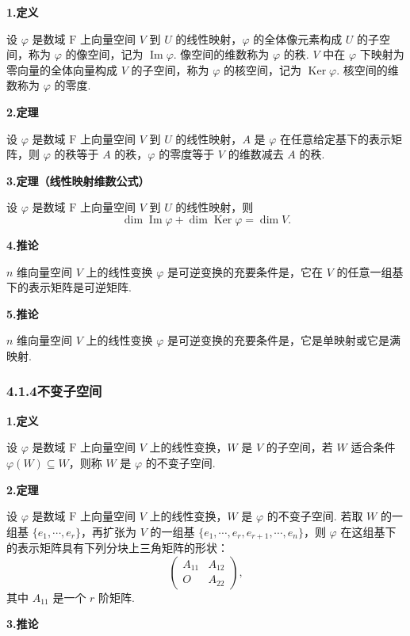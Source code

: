 \documentclass[UTF8,12pt,a4paper,fontset=fandol]{ctexart}
\begin{document}
\noindent\textbf{1.\quad 定义}

设 $\varphi$ 是数域 $\mathrm{F}$ 上向量空间 $V$ 到 $U$ 的线性映射，$\varphi$ 的全体像元素构成 $U$ 的子空间，称为 $\varphi$ 的像空间，记为 $\operatorname{Im}\varphi$. 像空间的维数称为 $\varphi$ 的秩. $V$ 中在 $\varphi$ 下映射为零向量的全体向量构成 $V$ 的子空间，称为 $\varphi$ 的核空间，记为 $\operatorname{Ker}\varphi$. 核空间的维数称为 $\varphi$ 的零度.

\noindent\textbf{2.\quad 定理}

设 $\varphi$ 是数域 $\mathrm{F}$ 上向量空间 $V$ 到 $U$ 的线性映射，$A$ 是 $\varphi$ 在任意给定基下的表示矩阵，则 $\varphi$ 的秩等于 $A$ 的秩，$\varphi$ 的零度等于 $V$ 的维数减去 $A$ 的秩.

\noindent\textbf{3.\quad 定理（线性映射维数公式）}

设 $\varphi$ 是数域 $\mathrm{F}$ 上向量空间 $V$ 到 $U$ 的线性映射，则
\[
\dim\operatorname{Im}\varphi+\dim\operatorname{Ker}\varphi=\dim V.
\]

\noindent\textbf{4.\quad 推论}

$n$ 维向量空间 $V$ 上的线性变换 $\varphi$ 是可逆变换的充要条件是，它在 $V$ 的任意一组基下的表示矩阵是可逆矩阵.

\noindent\textbf{5.\quad 推论}

$n$ 维向量空间 $V$ 上的线性变换 $\varphi$ 是可逆变换的充要条件是，它是单映射或它是满映射.

\subsubsection*{4.1.4\quad 不变子空间}

\noindent\textbf{1.\quad 定义}

设 $\varphi$ 是数域 $\mathrm{F}$ 上向量空间 $V$ 上的线性变换，$W$ 是 $V$ 的子空间，若 $W$ 适合条件 $\varphi(W)\subseteq W$，则称 $W$ 是 $\varphi$ 的不变子空间.

\noindent\textbf{2.\quad 定理}

设 $\varphi$ 是数域 $\mathrm{F}$ 上向量空间 $V$ 上的线性变换，$W$ 是 $\varphi$ 的不变子空间. 若取 $W$ 的一组基 $\{e_1,\cdots,e_r\}$，再扩张为 $V$ 的一组基 $\{e_1,\cdots,e_r,e_{r+1},\cdots,e_n\}$，则 $\varphi$ 在这组基下的表示矩阵具有下列分块上三角矩阵的形状：
\[
\left(\begin{array}{cc}
A_{11} & A_{12}\\
O & A_{22}
\end{array}\right),
\]
其中 $A_{11}$ 是一个 $r$ 阶矩阵.

\noindent\textbf{3.\quad 推论}
\end{document}
